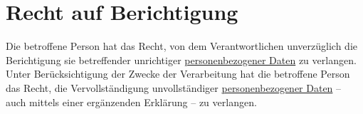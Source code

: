 \chapter{Recht auf Berichtigung}
\label{ch:16}


Die betroffene Person hat das Recht, von dem Verantwortlichen unverzüglich die Berichtigung sie betreffender unrichtiger
\hyperref[itm:04-1]{personenbezogener Daten} zu verlangen. Unter Berücksichtigung der Zwecke der Verarbeitung hat die betroffene Person das
Recht, die Vervollständigung unvollständiger \hyperref[itm:04-1]{personenbezogener Daten} -- auch mittels einer ergänzenden Erklärung -- zu
verlangen.


